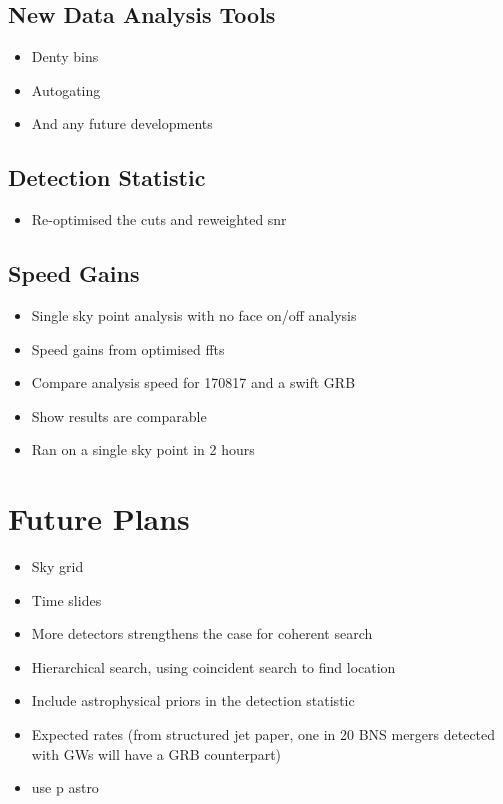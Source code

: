 \documentclass[11pt]{cuthesis}
\begin{document}
\subsection{New Data Analysis Tools}
\begin{itemize}
\item Denty bins
\item Autogating
\item And any future developments
\end{itemize}



\subsection{Detection Statistic}
\begin{itemize}
\item Re-optimised the cuts and reweighted snr
\end{itemize}

\subsection{Speed Gains}
\begin{itemize}
\item Single sky point analysis with no face on/off analysis
\item Speed gains from optimised ffts
\item Compare analysis speed for 170817 and a swift GRB
\item Show results are comparable 
\item Ran on a single sky point in 2 hours 
\end{itemize}

\section{Future Plans}
\begin{itemize}
\item Sky grid
\item Time slides
\item More detectors strengthens the case for coherent search
\item Hierarchical search, using coincident search to find location 
\item Include astrophysical priors in the detection statistic
\item Expected rates (from structured jet paper, one in 20 BNS mergers detected with GWs will have a GRB counterpart)
\item use p astro
\end{itemize}
\end{document}
